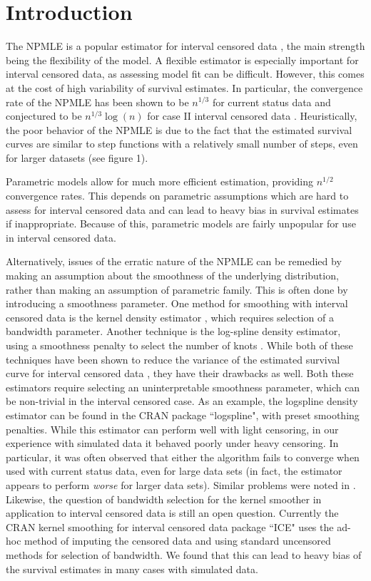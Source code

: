 \section{Introduction}
\label{intro}

	The NPMLE is a popular estimator for interval censored data \cite{RefT1976}, the main strength being the flexibility of the model. A flexible estimator is especially important for interval censored data, as assessing model fit can be difficult. However, this comes at the cost of high variability of survival estimates. In particular, the convergence rate of the NPMLE has been shown to be $n^{1/3}$ for current status data \cite{RefG1987} and conjectured to be $ n^{1/3}\log(n)$ for case II interval censored data \cite{RefG1991}. Heuristically, the poor behavior of the NPMLE is due to the fact that the estimated survival curves are similar to step functions with a relatively small number of steps, even for larger datasets (see figure 1).


	Parametric models allow for much more efficient estimation, providing $n^{1/2}$ convergence rates. This depends on parametric assumptions which are hard to assess for interval censored data and can lead to heavy bias in survival estimates if inappropriate. Because of this, parametric models are fairly unpopular for use in interval censored data. 	
	
	Alternatively, issues of the erratic nature of the NPMLE can be remedied by making an assumption about the smoothness of the underlying distribution, rather than making an assumption of parametric family.  This is often done by introducing a smoothness parameter. One method for smoothing with interval censored data is the kernel density estimator \cite{RefBea2005}, which requires selection of a bandwidth parameter. Another technique is the log-spline density estimator, using a smoothness penalty to select the number of knots \cite{RefKS1992}. While both of these techniques have been shown to reduce the variance of the estimated survival curve for interval censored data \cite{RefP2000}, they have their drawbacks as well. Both these estimators require selecting an uninterpretable smoothness parameter, which can be non-trivial in the interval censored case. As an example, the logspline density estimator can be found in the CRAN package  ``logspline", with preset smoothing penalties. While this estimator can perform well with light censoring, in our experience with simulated data it behaved poorly under heavy censoring. In particular, it was often observed that either the algorithm fails to converge when used with current status data, even for large data sets (in fact, the estimator appears to perform \emph{worse} for larger data sets). Similar problems were noted in \cite{RefP2000}.  Likewise, the question of bandwidth selection for the kernel smoother in application to interval censored data is still an open question. Currently the CRAN kernel smoothing for interval censored data package ``ICE" uses the ad-hoc method of imputing the censored data and using standard uncensored methods for selection of bandwidth. We found that this can lead to heavy bias of the survival estimates in many cases with simulated data.  
	 

